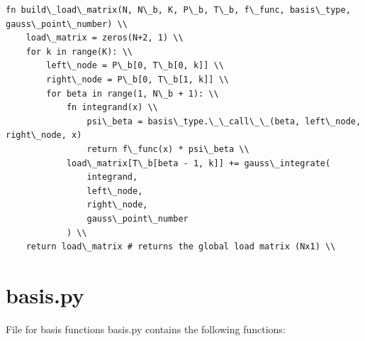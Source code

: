 \documentclass[12pt, oneside]{book}
\begin{document}
\begin{lstlisting}
fn build\_load\_matrix(N, N\_b, K, P\_b, T\_b, f\_func, basis\_type, gauss\_point\_number) \\
    load\_matrix = zeros(N+2, 1) \\
    for k in range(K): \\
        left\_node = P\_b[0, T\_b[0, k]] \\
        right\_node = P\_b[0, T\_b[1, k]] \\
        for beta in range(1, N\_b + 1): \\
            fn integrand(x) \\
                psi\_beta = basis\_type.\_\_call\_\_(beta, left\_node, right\_node, x)
                return f\_func(x) * psi\_beta \\
            load\_matrix[T\_b[beta - 1, k]] += gauss\_integrate(
                integrand, 
                left\_node, 
                right\_node, 
                gauss\_point\_number
            ) \\
    return load\_matrix # returns the global load matrix (Nx1) \\
\end{lstlisting}

\section{basis.py}
            
File for basis functions basis.py contains the following functions:
\end{document}

